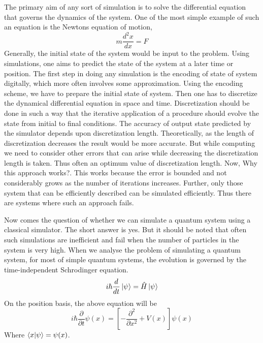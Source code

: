 \documentclass[12pt,a4paper]{report}
\begin{document}
The primary aim of any sort of simulation is to solve the differential equation that governs the dynamics of the system. One of the most simple example of such an equation is the Newtons equation of motion,
\begin{equation}
m\frac{d^{2}x}{dx} = F
\end{equation}
Generally, the initial state of the system would be input to the problem. Using simulations, one aims to predict the state of the system at a later time or position. The first step in doing any simulation is the encoding of state of system digitally, which more often involves some approximation. Using the encoding scheme, we have to prepare the initial state of system. Then one has to discretize the dynamical differential equation in space and time. Discretization should be done in such a way that the iterative application of a procedure should evolve the state from initial to final conditions. The accuracy of output state predicted by the simulator depends upon discretization length. Theoretically, as the length of discretization decreases the result would be more accurate. But while computing we need to consider other errors that can arise while decreasing the discretization length is taken. Thus often an optimum value of discretization length. Now, Why this approach works?. This works because the error is bounded and not considerably grows as the number of iterations increases. Further, only those system that can be efficiently described can be simulated efficiently. Thus there are systems where such an approach fails.\par
Now comes the question of whether we can simulate a quantum system using a classical simulator. The short answer is yes. But it should be noted that often such simulations are inefficient and fail when the number of particles in the system is very high.  When we analyse the problem of simulating a quantum system, for most of simple quantum systems, the evolution is governed by the time-independent Schrodinger equation. 
\begin{equation}
i\hbar \frac{d}{dt}\ket{\psi} = \hat{H} \ket{\psi}
\end{equation}
On the position basis, the above equation will be 
\begin{equation}
i\hbar\frac{\partial}{\partial t}\psi(x)= \left[ -\frac{\partial^{2}}{\partial x^{2}}+V(x)\right] \psi(x)
\end{equation}
Where $\braket{x|\psi} = \psi(x)$.\par
\end{document}
